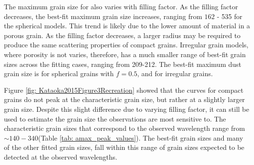 
The maximum grain size for also varies with filling factor. As the filling factor decreases, the best-fit maximum grain size increases, ranging from $162$ - 535 \micron for the spherical models. This trend is likely due to the lower amount of material in a porous grain. As the filling factor decreases, a larger radius may be required to produce the same scattering properties of compact grains. Irregular grain models, where porosity is not varies, therefore, has a much smaller range of best-fit grain sizes across the fitting cases, ranging from 209-212\micronNS. The best-fit maximum dust grain size is \sbest for spherical grains with $f=0.5$, and \ibest for irregular grains.

 
Figure \ref{fig: Kataoka2015Figure3Recreation} showed that the \Pweff curves for compact grains do not peak at the characteristic grain size, but rather at a slightly larger grain size. Despite this slight difference due to varying filling factor, it can still be used to estimate the grain size the observations are most sensitive to. The characteristic grain sizes that correspond to the observed wavelength range from $\sim140-340$\micron (Table \ref{tab: amax_peak_values}). The best-fit grain sizes and many of the other fitted grain sizes, fall within this range of grain sizes expected to be detected at the observed wavelengths. 








